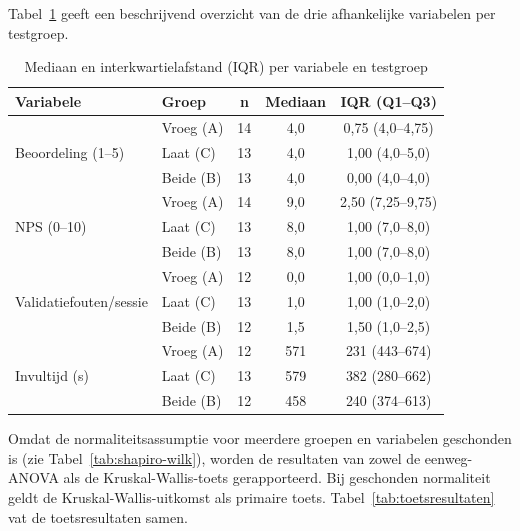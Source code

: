 \section{}

Tabel~\ref{tab:beschrijvend} geeft een beschrijvend overzicht van de drie afhankelijke variabelen per testgroep.

\begin{table}[h]
  \centering
  \caption[Beschrijvende statistieken per testgroep]{Mediaan en interkwartielafstand (IQR) per variabele en testgroep}
  \label{tab:beschrijvend}
  \begin{tabular}{llccc}
    \hline
    \textbf{Variabele} & \textbf{Groep} & \textbf{n} & \textbf{Mediaan} & \textbf{IQR (Q1–Q3)} \\
    \hline
    \multirow{3}{*}{Beoordeling (1–5)}
      & Vroeg (A)  & 14 & 4,0 & 0,75 (4,0–4,75) \\
      & Laat (C)   & 13 & 4,0 & 1,00 (4,0–5,0)  \\
      & Beide (B)  & 13 & 4,0 & 0,00 (4,0–4,0)  \\
    \hline
    \multirow{3}{*}{NPS (0–10)}
      & Vroeg (A)  & 14 & 9,0 & 2,50 (7,25–9,75) \\
      & Laat (C)   & 13 & 8,0 & 1,00 (7,0–8,0)   \\
      & Beide (B)  & 13 & 8,0 & 1,00 (7,0–8,0)   \\
    \hline
    \multirow{3}{*}{Validatiefouten/sessie}
      & Vroeg (A)  & 12 & 0,0 & 1,00 (0,0–1,0)  \\
      & Laat (C)   & 13 & 1,0 & 1,00 (1,0–2,0)  \\
      & Beide (B)  & 12 & 1,5 & 1,50 (1,0–2,5)  \\
    \hline
    \multirow{3}{*}{Invultijd (s)}
      & Vroeg (A)  & 12 & 571 & 231 (443–674) \\
      & Laat (C)   & 13 & 579 & 382 (280–662) \\
      & Beide (B)  & 12 & 458 & 240 (374–613) \\
    \hline
  \end{tabular}
\end{table}

Omdat de normaliteitsassumptie voor meerdere groepen en variabelen geschonden is (zie Tabel~\ref{tab:shapiro-wilk}), worden de resultaten van zowel de eenweg-ANOVA als de Kruskal-Wallis-toets gerapporteerd. Bij geschonden normaliteit geldt de Kruskal-Wallis-uitkomst als primaire toets. Tabel~\ref{tab:toetsresultaten} vat de toetsresultaten samen.

